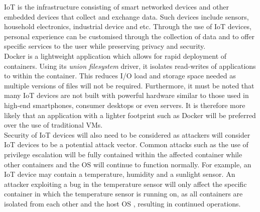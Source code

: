 \documentclass[a4paper,12pt]{article}
\begin{document}
{{		\ac{IoT} is the infrastructure consisting of smart networked devices and other embedded devices that collect and exchange data. Such devices include sensors, household electronics, industrial device and etc. Through the use of \ac{IoT} devices, personal experience can be customised through the collection of data and to offer specific services to the user while preserving privacy and security.\\\newline
		Docker is a lightweight application which allows for rapid deployment of containers. Using its \textit{union filesystem} driver, it isolates read-writes of applications to within the container. This reduces \ac{I/O} load and storage space needed as multiple versions of files will not be required. Furthermore, it must be noted that many \ac{IoT} devices are not built with powerful hardware similar to those used in high-end smartphones, consumer desktops or even servers. It is therefore more likely that an application with a lighter footprint such as Docker will be preferred over the use of traditional \ac{VM}s.\\\newline
		Security of \ac{IoT} devices will also need to be considered as attackers will consider \ac{IoT} devices to be a potential attack vector. Common attacks such as the use of privilege escalation will be fully contained within the affected container while other containers and the \ac{OS} will continue to function normally. For example, an \ac{IoT} device may contain a temperature, humidity and a sunlight sensor. An attacker exploiting a bug in the temperature sensor will only affect the specific container in which the temperature sensor is running on, as all containers are isolated from each other and the host \ac{OS} \cite{consec}, resulting in continued operations.
		\noindent 
	}

}
\end{document}
